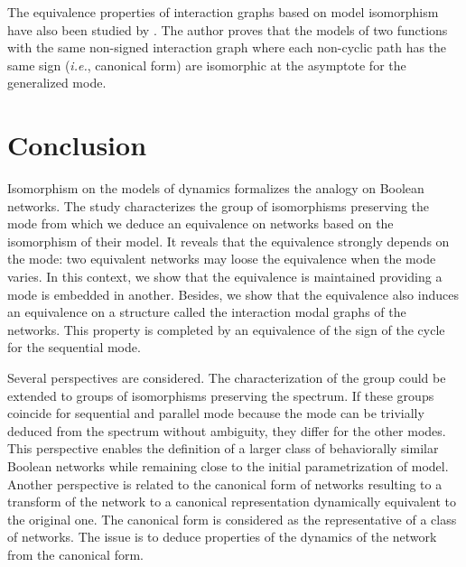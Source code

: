 \documentclass[12pt]{elsarticle}
\newcommand{\abbrev}[1]{#1, \relax}
\newcommand{\ie}[0]{\abbrev{\textit{i.e.}}}
\begin{document}
 The equivalence properties of interaction graphs based on model isomorphism have also been studied by \cite{Noual2012}. The author proves that the models of two functions with the same non-signed interaction graph where each non-cyclic path has the same sign (\ie canonical form) are isomorphic at the asymptote for the generalized mode.

\section{Conclusion}
Isomorphism on the models of dynamics formalizes the analogy on  Boolean networks. 
The study characterizes the group of isomorphisms preserving the mode from which we deduce an equivalence on networks based on the isomorphism of their model. It reveals that the equivalence strongly depends on the mode: two equivalent networks may loose the equivalence when the mode varies. In this context, we show that the equivalence is maintained providing a mode is embedded in another. Besides, we show that the equivalence also induces an equivalence on a structure called the interaction modal graphs of the networks. This property is completed by an equivalence of the sign of the cycle for the sequential mode.

Several perspectives are considered. The characterization of the group could be extended to groups of isomorphisms preserving the spectrum. If these groups coincide for sequential and parallel mode because the mode can be trivially deduced from the spectrum without ambiguity, they differ for the other modes. This perspective enables the definition of a larger class of behaviorally similar Boolean networks while remaining close to the initial parametrization of model. Another perspective is related to the canonical form of networks resulting to  a transform of the network to a canonical representation dynamically equivalent to the original one. The canonical form is considered as the representative of a class of networks.
 The issue is to deduce properties of the dynamics of the network from the canonical form. 

\pagebreak
\appendix
\end{document}

